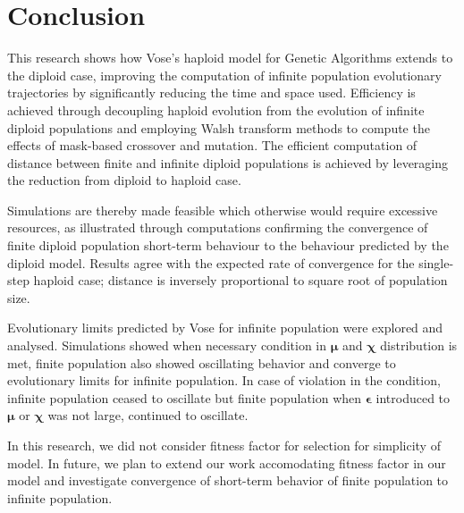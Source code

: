\chapter{Conclusion}
This research shows how Vose's haploid model for Genetic Algorithms
extends to the diploid case, improving the computation of infinite
population evolutionary trajectories by significantly reducing the
time and space used.  Efficiency is achieved through decoupling
haploid evolution from the evolution of infinite diploid populations
and employing Walsh transform methods to compute the effects of
mask-based crossover and mutation.  The efficient computation of
distance between finite and infinite diploid populations is achieved
by leveraging the reduction from diploid to haploid case.

Simulations are thereby made feasible which otherwise would require
excessive resources, as illustrated through computations confirming
the convergence of finite diploid population short-term behaviour to
the behaviour predicted by the diploid model. Results agree with the
expected rate of convergence for the single-step haploid case;
distance is inversely proportional to square root of population size.

Evolutionary limits predicted by Vose for infinite population were explored and analysed. Simulations showed when necessary condition in $\bm{\mu}$ and $\bm{\chi}$ distribution is met, finite population also showed oscillating behavior and converge to evolutionary limits for infinite population. In case of violation in the condition, infinite population ceased to oscillate but finite population when $\bm{\epsilon}$ introduced to $\bm{\mu}$ or $\bm{\chi}$ was not large, continued to oscillate.

In this research, we did not consider fitness factor for selection for simplicity of model. In future, we plan to extend our work accomodating fitness factor in our model and investigate convergence of short-term behavior of finite population to infinite population.


